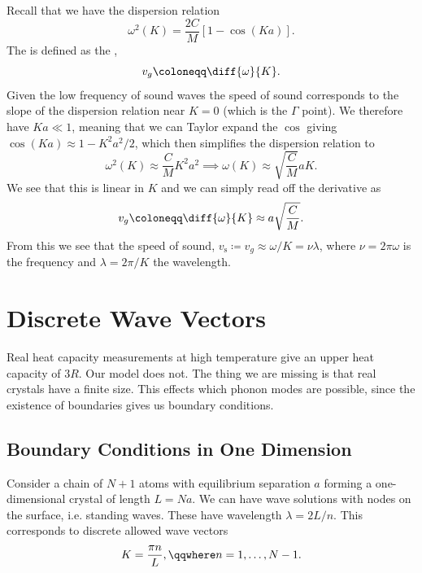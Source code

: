 \documentclass[fleqn]{NotesClass}
\newcommand*{\sound}{\mathrm{s}}
\begin{document}
    Recall that we have the dispersion relation
    \begin{equation}
        \omega^2(K) = \frac{2C}{M}[1 - \cos(Ka)].
    \end{equation}
    The  is defined as the ,
    \begin{equation}
        v_g \coloneqq \diff{\omega}{K}.
    \end{equation}
    Given the low frequency of sound waves the speed of sound corresponds to the slope of the dispersion relation near \(K = 0\) (which is the \(\Gamma\) point).
    We therefore have \(Ka \ll 1\), meaning that we can Taylor expand the \(\cos\) giving \(\cos(Ka) \approx 1 - K^2a^2/2\), which then simplifies the dispersion relation to
    \begin{equation}
        \omega^2(K) \approx\frac{C}{M} K^2a^2 \implies \omega(K) \approx \sqrt{\frac{C}{M}}aK.
    \end{equation}
    We see that this is linear in \(K\) and we can simply read off the derivative as
    \begin{equation}
        v_g \coloneqq \diff{\omega}{K} \approx a\sqrt{\frac{C}{M}}.
    \end{equation}
    From this we see that the speed of sound, \(v_{\sound} \coloneqq v_g \approx \omega/K = \nu \lambda\), where \(\nu = 2\pi\omega\) is the frequency and \(\lambda = 2\pi/K\) the wavelength.
    
    \section{Discrete Wave Vectors}
    Real heat capacity measurements at high temperature give an upper heat capacity of \(3R\).
    Our model does not.
    The thing we are missing is that real crystals have a finite size.
    This effects which phonon modes are possible, since the existence of boundaries gives us boundary conditions.
    
    \subsection{Boundary Conditions in One Dimension}
    Consider a chain of \(N + 1\) atoms with equilibrium separation \(a\) forming a one-dimensional crystal of length \(L = Na\).
    We can have wave solutions with nodes on the surface, i.e. standing waves.
    These have wavelength \(\lambda = 2L/n\).
    This corresponds to discrete allowed wave vectors
    \begin{equation}
        K = \frac{\pi n}{L}, \qqwhere n = 1, \dotsc, N - 1.
    \end{equation}
    
\end{document}
